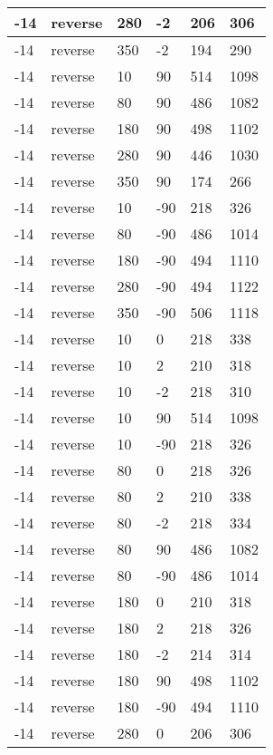 \begin{longtable}{|l|l|l|l|l|l|}
			\hline
			-14 & reverse & 280 & -2 & 206 & 306 \\
			\hline
			-14 & reverse & 350 & -2 & 194 & 290 \\
			\hline
			-14 & reverse & 10 & 90 & 514 & 1098 \\
			\hline
			-14 & reverse & 80 & 90 & 486 & 1082 \\
			\hline
			-14 & reverse & 180 & 90 & 498 & 1102 \\
			\hline
			-14 & reverse & 280 & 90 & 446 & 1030 \\
			\hline
			-14 & reverse & 350 & 90 & 174 & 266 \\
			\hline
			-14 & reverse & 10 & -90 & 218 & 326 \\
			\hline
			-14 & reverse & 80 & -90 & 486 & 1014 \\
			\hline
			-14 & reverse & 180 & -90 & 494 & 1110 \\
			\hline
			-14 & reverse & 280 & -90 & 494 & 1122 \\
			\hline
			-14 & reverse & 350 & -90 & 506 & 1118 \\
			\hline
			-14 & reverse & 10 & 0 & 218 & 338 \\
			\hline
			-14 & reverse & 10 & 2 & 210 & 318 \\
			\hline
			-14 & reverse & 10 & -2 & 218 & 310 \\
			\hline
			-14 & reverse & 10 & 90 & 514 & 1098 \\
			\hline
			-14 & reverse & 10 & -90 & 218 & 326 \\
			\hline
			-14 & reverse & 80 & 0 & 218 & 326 \\
			\hline
			-14 & reverse & 80 & 2 & 210 & 338 \\
			\hline
			-14 & reverse & 80 & -2 & 218 & 334 \\
			\hline
			-14 & reverse & 80 & 90 & 486 & 1082 \\
			\hline
			-14 & reverse & 80 & -90 & 486 & 1014 \\
			\hline
			-14 & reverse & 180 & 0 & 210 & 318 \\
			\hline
			-14 & reverse & 180 & 2 & 218 & 326 \\
			\hline
			-14 & reverse & 180 & -2 & 214 & 314 \\
			\hline
			-14 & reverse & 180 & 90 & 498 & 1102 \\
			\hline
			-14 & reverse & 180 & -90 & 494 & 1110 \\
			\hline
			-14 & reverse & 280 & 0 & 206 & 306 \\

\end{longtable}

